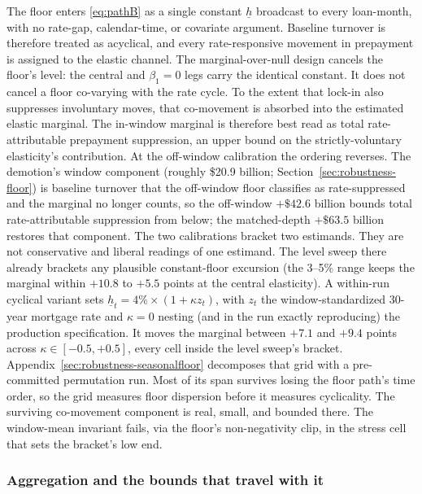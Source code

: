 \documentclass[12pt]{article}
\begin{document}
The floor enters \eqref{eq:pathB} as a single constant $\underline{h}$ broadcast to every loan-month, with no rate-gap, calendar-time, or covariate argument. Baseline turnover is therefore treated as acyclical, and every rate-responsive movement in prepayment is assigned to the elastic channel. The marginal-over-null design cancels the floor's level: the central and $\beta_1 = 0$ legs carry the identical constant. It does not cancel a floor co-varying with the rate cycle. To the extent that lock-in also suppresses involuntary moves, that co-movement is absorbed into the estimated elastic marginal. The in-window marginal is therefore best read as total rate-attributable prepayment suppression, an upper bound on the strictly-voluntary elasticity's contribution. At the off-window calibration the ordering reverses. The demotion's window component (roughly \$20.9 billion; Section~\ref{sec:robustness-floor}) is baseline turnover that the off-window floor classifies as rate-suppressed and the marginal no longer counts, so the off-window $+\$42.6$ billion bounds total rate-attributable suppression from below; the matched-depth $+\$63.5$ billion restores that component. The two calibrations bracket two estimands. They are not conservative and liberal readings of one estimand. The level sweep there already brackets any plausible constant-floor excursion (the 3--5\% range keeps the marginal within $+10.8$ to $+5.5$ points at the central elasticity). A within-run cyclical variant sets $\underline{h}_t = 4\% \times (1 + \kappa z_t)$, with $z_t$ the window-standardized 30-year mortgage rate and $\kappa = 0$ nesting (and in the run exactly reproducing) the production specification. It moves the marginal between $+7.1$ and $+9.4$ points across $\kappa \in [-0.5, +0.5]$, every cell inside the level sweep's bracket. Appendix~\ref{sec:robustness-seasonalfloor} decomposes that grid with a pre-committed permutation run. Most of its span survives losing the floor path's time order, so the grid measures floor dispersion before it measures cyclicality. The surviving co-movement component is real, small, and bounded there. The window-mean invariant fails, via the floor's non-negativity clip, in the stress cell that sets the bracket's low end.

\subsubsection{Aggregation and the bounds that travel with it}
\end{document}
